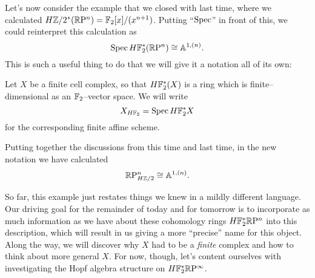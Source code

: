 Let's now consider the example that we closed with last time, where we calculated $H\mathbb Z/2^*(\mathbb R\mathrm P^n) = \mathbb F_2[x] / (x^{n+1})$.  Putting ``$\operatorname{Spec}$'' in front of this, we could reinterpret this calculation as \[\operatorname{Spec} H\mathbb F_2^*(\mathbb R\mathrm P^n) \cong \mathbb A^{1, (n)}.\]  This is such a useful thing to do that we will give it a notation all of its own:

\begin{definition}
Let $X$ be a finite cell complex, so that $H\mathbb F_2^*(X)$ is a ring which is finite--dimensional as an $\mathbb F_2$--vector space.  We will write \[X_{H\mathbb F_2} = \operatorname{Spec} H\mathbb F_2^* X\] for the corresponding finite affine scheme.
\end{definition}

\begin{example}
Putting together the discussions from this time and last time, in the new notation we have calculated \[\mathbb R\mathrm P^n_{H\mathbb Z/2} \cong \mathbb A^{1, (n)}.\]
\end{example}

So far, this example just restates things we knew in a mildly different language.  Our driving goal for the remainder of today and for tomorrow is to incorporate as much information as we have about these cohomology rings $H\mathbb F_2^* \mathbb R\mathrm P^n$ into this description, which will result in us giving a more ``precise'' name for this object.  Along the way, we will discover why $X$ had to be a \emph{finite} complex and how to think about more general $X$.  For now, though, let's content ourselves with investigating the Hopf algebra structure on $H\mathbb F_2^* \mathbb R\mathrm P^\infty$.

